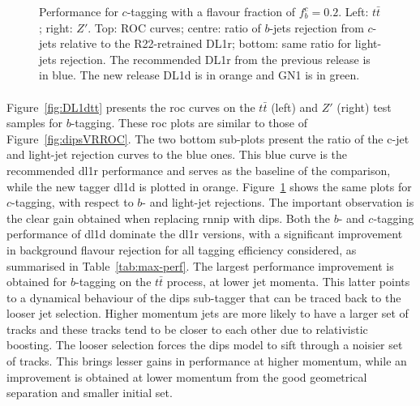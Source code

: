 \begin{figure}[h!]
{  }
  \caption{Performance for $c$-tagging with a flavour fraction of $f^c_b = 0.2$. Left: $t\bar{t}$; right: $Z'$. Top: ROC curves; centre: ratio of $b$-jets rejection from $c$-jets relative to the R22-retrained DL1r; bottom: same ratio for light-jets rejection. The recommended DL1r from the previous release is in blue. The new release DL1d is in orange and GN1 is in green.}
  \label{fig:DL1dz}
\end{figure}

\paragraph{}Figure~\ref{fig:DL1dtt} presents the \gls{roc} curves on the $t\bar{t}$ (left) and $Z'$ (right) test samples for $b$-tagging. These \gls{roc} plots are similar to those of Figure~\ref{fig:dipsVRROC}. The two bottom sub-plots present the ratio of the c-jet and light-jet rejection curves to the blue ones. This blue curve is the recommended \gls{dl1r} performance and serves as the baseline of the comparison, while the new tagger \gls{dl1d} is plotted in orange. Figure~\ref{fig:DL1dz} shows the same plots for $c$-tagging, with respect to $b$- and light-jet rejections. The important observation is the clear gain obtained when replacing \gls{rnnip} with \gls{dips}. Both the $b$- and $c$-tagging performance of \gls{dl1d} dominate the \gls{dl1r} versions, with a significant improvement in background flavour rejection for all tagging efficiency considered, as summarised in Table~\ref{tab:max-perf}. The largest performance improvement is obtained for $b$-tagging on the $t\bar{t}$ process, at lower jet momenta. This latter points to a dynamical behaviour of the \gls{dips} sub-tagger that can be traced back to the looser jet selection. Higher momentum jets are more likely to have a larger set of tracks and these tracks tend to be closer to each other due to relativistic boosting. The looser selection forces the \gls{dips} model to sift through a noisier set of tracks. This brings lesser gains in performance at higher momentum, while an improvement is obtained at lower momentum from the good geometrical separation and smaller initial set.  \\


